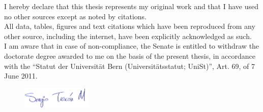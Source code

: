 
\begin{declaration}
	\addchaptertocentry{\authorshipname} %
	
	\vspace{1cm}
	
	 \vspace{0.5cm}
	
	 \vspace{2cm}
	
	{\noindent I  hereby  declare  that  this  thesis represents my  original  work and  that  I  have  used  no  other sources except as noted by citations.\\
		All  data,  tables,  figures  and  text  citations  which  have  been  reproduced  from  any  other source, including the internet, have been explicitly acknowledged as such.\\
		I am aware that in case of non-compliance, the Senate is entitled to withdraw the doctorate degree awarded to me on the basis of the present thesis, in accordance with the “Statut der Universität Bern (Universitätsstatut; UniSt)”, Art. 69, of 7 June 2011.\par} \vspace{1cm}
	
	
	 \vspace{1cm}
    \begin{figure}[h]
    \includegraphics[width=0.3\textwidth]{Figures/signature.png}
    \end{figure}
 
\end{declaration}